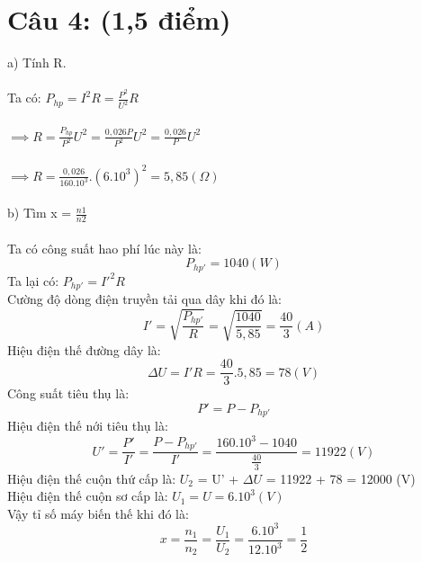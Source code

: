 \documentclass[15pt]{article}
\begin{document}
\section*{Câu 4: (1,5 điểm)}
a) Tính R.\\
\\
Ta có: $P_{hp} = I^2R = \frac{P^2}{U^2}R$\\
\\
$\implies R = \frac{P_{hp}}{P^2}U^2 = \frac{0,026P}{P^2}U^2 = \frac{0,026}{P}U^2$\\
\\
$\implies R = \frac{0,026}{160.10^3}.(6.10^3)^2 = 5,85 (\Omega)$\\
\\
b) Tìm x = $\frac{n1}{n2}$\\
\\
Ta có công suất hao phí lúc này là:
\begin{equation*}
    P_{hp'} = 1040 (W)
\end{equation*}
Ta lại có: $P_{hp'} = I'^2R$\\
Cường độ dòng điện truyền tải qua dây khi đó là:
\begin{equation*}
    I' = \sqrt{\frac{P_{hp'}}{R}} = \sqrt{\frac{1040}{5,85}} = \frac{40}{3} (A)
\end{equation*}
Hiệu điện thế đường dây là:
\begin{equation*}
    \Delta U = I'R = \frac{40}{3}.5,85 = 78 (V)
\end{equation*}
Công suất tiêu thụ là:
\begin{equation*}
    P' = P - P_{hp'}
\end{equation*}
Hiệu điện thế nới tiêu thụ là:
\begin{equation*}
    U' = \frac{P'}{I'} = \frac{P - P_{hp'}}{I'} = \frac{160.10^3 - 1040}{\frac{40}{3}} = 11922 (V)
\end{equation*}
Hiệu điện thế cuộn thứ cấp là: $U_{2}$ = U' + $\Delta U$ = 11922 + 78 = 12000 (V)\\
Hiệu điện thế cuộn sơ cấp là: $U_{1} = U = 6.10^3 (V)$\\
Vậy tỉ số máy biến thế khi đó là:
\begin{equation*}
    x = \frac{n_{1}}{n_{2}} = \frac{U_{1}}{U_{2}} = \frac{6.10^3}{12.10^3} = \frac{1}{2}
\end{equation*}
\end{document}
